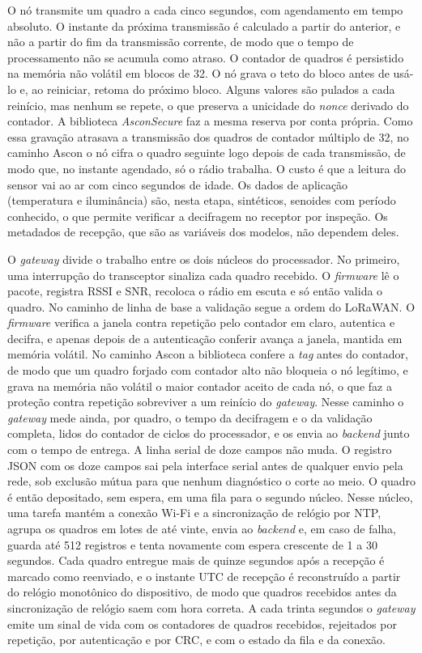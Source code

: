 O nó transmite um quadro a cada cinco segundos, com agendamento em tempo absoluto. O instante da próxima transmissão é calculado a partir do anterior, e não a partir do fim da transmissão corrente, de modo que o tempo de processamento não se acumula como atraso. O contador de quadros é persistido na memória não volátil em blocos de 32. O nó grava o teto do bloco antes de usá-lo e, ao reiniciar, retoma do próximo bloco. Alguns valores são pulados a cada reinício, mas nenhum se repete, o que preserva a unicidade do \textit{nonce} derivado do contador. A biblioteca \textit{AsconSecure} faz a mesma reserva por conta própria. Como essa gravação atrasava a transmissão dos quadros de contador múltiplo de 32, no caminho Ascon o nó cifra o quadro seguinte logo depois de cada transmissão, de modo que, no instante agendado, só o rádio trabalha. O custo é que a leitura do sensor vai ao ar com cinco segundos de idade. Os dados de aplicação (temperatura e iluminância) são, nesta etapa, sintéticos, senoides com período conhecido, o que permite verificar a decifragem no receptor por inspeção. Os metadados de recepção, que são as variáveis dos modelos, não dependem deles.

O \textit{gateway} divide o trabalho entre os dois núcleos do processador. No primeiro, uma interrupção do transceptor sinaliza cada quadro recebido. O \textit{firmware} lê o pacote, registra RSSI e SNR, recoloca o rádio em escuta e só então valida o quadro. No caminho de linha de base a validação segue a ordem do LoRaWAN. O \textit{firmware} verifica a janela contra repetição pelo contador em claro, autentica e decifra, e apenas depois de a autenticação conferir avança a janela, mantida em memória volátil. No caminho Ascon a biblioteca confere a \textit{tag} antes do contador, de modo que um quadro forjado com contador alto não bloqueia o nó legítimo, e grava na memória não volátil o maior contador aceito de cada nó, o que faz a proteção contra repetição sobreviver a um reinício do \textit{gateway}. Nesse caminho o \textit{gateway} mede ainda, por quadro, o tempo da decifragem e o da validação completa, lidos do contador de ciclos do processador, e os envia ao \textit{backend} junto com o tempo de entrega. A linha serial de doze campos não muda. O registro JSON com os doze campos sai pela interface serial antes de qualquer envio pela rede, sob exclusão mútua para que nenhum diagnóstico o corte ao meio. O quadro é então depositado, sem espera, em uma fila para o segundo núcleo. Nesse núcleo, uma tarefa mantém a conexão Wi-Fi e a sincronização de relógio por NTP, agrupa os quadros em lotes de até vinte, envia ao \textit{backend} e, em caso de falha, guarda até 512 registros e tenta novamente com espera crescente de 1 a 30 segundos. Cada quadro entregue mais de quinze segundos após a recepção é marcado como reenviado, e o instante UTC de recepção é reconstruído a partir do relógio monotônico do dispositivo, de modo que quadros recebidos antes da sincronização de relógio saem com hora correta. A cada trinta segundos o \textit{gateway} emite um sinal de vida com os contadores de quadros recebidos, rejeitados por repetição, por autenticação e por CRC, e com o estado da fila e da conexão.

